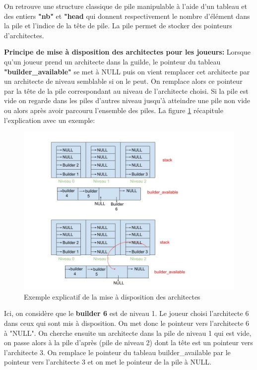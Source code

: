 \documentclass{article}
\begin{document}
        On retrouve une structure classique de pile manipulable à l'aide d'un tableau et des entiers \textbf{"nb"} et \textbf{"head} qui donnent respectivement le nombre d'élément dans la pile et l'indice de la tête de pile. La pile permet de stocker des pointeurs d'architectes.

        \vspace{1em}
        
        \textbf{Principe de mise à disposition des architectes pour les joueurs:}
        Lorsque qu'un joueur prend un architecte dans la guilde, le pointeur du tableau \textbf{"builder\_available"} se met à NULL puis on vient remplacer cet architecte par un architecte de niveau semblable si on le peut. On remplace alors ce pointeur par la tête de la pile correspondant au niveau de l'architecte choisi. Si la pile est vide on regarde dans les piles d'autres niveau jusqu'à atteindre une pile non vide ou alors après avoir parcouru l'ensemble des piles. La figure \ref{explication_guild_achiev1} récapitule l'explication avec un exemple:

 
        \begin{figure}[!ht]
            \centering
            \includegraphics[width=0.7\linewidth]{explication_guild_achiev1.jpg}
            \caption{Exemple explicatif de la mise à disposition des architectes}
            \label{explication_guild_achiev1}
        \end{figure}

        \vspace{1cm}
        
        Ici, on considère que le \textbf{builder 6} est de niveau 1. Le joueur choisi l'architecte 6 dans ceux qui sont mis à disposition. On met donc le pointeur vers l'architecte 6 à "NULL". On cherche ensuite un architecte dans la pile de niveau 1 qui est vide, on passe alors à la pile d'après (pile de niveau 2) dont la tête est un pointeur vers l'architecte 3. On remplace le pointeur du tableau builder\_available par le pointeur vers l'architecte 3 et on met le pointeur de la pile à NULL.
\end{document}
